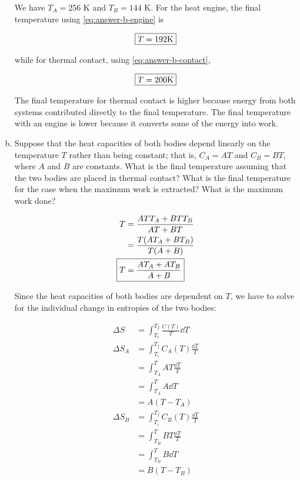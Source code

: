 \documentclass[9pt,a4paper,twocolumn]{article}
\begin{document}
\begin{enumerate}[(a)]
We have $T_A = 256$ K and $T_B = 144$ K. For the heat engine, the final temperature using \eqref{eq:answer-b-engine} is

\begin{equation}\label{eq:answer-c-engine}
	\boxed{ T = 192 $K$ }
\end{equation}

while for thermal contact, using \eqref{eq:answer-b-contact},

\begin{equation}\label{eq:answer-c-contact}
	\boxed{ T = 200 $K$ }
\end{equation}

The final temperature for thermal contact is higher because energy from both systems contributed directly to the final temperature. The final temperature with an engine is lower because it converts some of the energy into work.

\item Suppose that the heat capacities of both bodies depend linearly on the temperature $T$ rather than being constant; that is, $C_A = AT$ and $C_B = BT$, where $A$ and $B$ are constants. What is the final temperature assuming that the two bodies are placed in thermal contact? What is the final temperature for the case when the maximum work is extracted? What is the maximum work done?

\begin{align}
	T &= \frac{ATT_A + BTT_B}{AT + BT} \\
	&= \frac{T(AT_A + BT_B)}{T(A+B)} \\
	\Aboxed{
		T &= \frac{AT_A + AT_B}{A+B}
	}
\end{align}

Since the heat capacities of both bodies are dependent on $T$, we have to solve for the individual change in entropies of the two bodies:

\begin{align}
	\Delta S &= \int_{T_i}^{T_f} \frac{C(T)}{T}\dd{T} \\
	\Delta S_A &= \int_{T_i}^{T_f} C_A(T)\frac{\dd{T}}{T} \\
	&= \int_{T_A}^{T} AT\frac{\dd{T}}{T} \\
	&= \int_{T_A}^{T} A\dd{T} \\
	&= A(T - T_A) \\
	\Delta S_B &= \int_{T_i}^{T_f} C_B(T)\frac{\dd{T}}{T} \\
	&= \int_{T_B}^{T} BT\frac{\dd{T}}{T} \\
	&= \int_{T_B}^{T} B\dd{T} \\
	&= B(T - T_B)
\end{align}


\end{enumerate}
\end{document}
